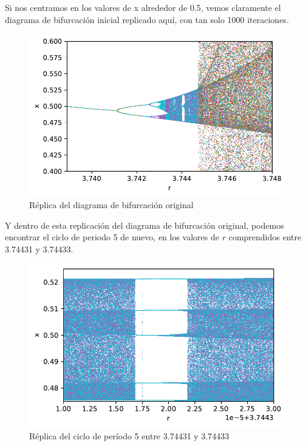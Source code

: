 \documentclass[
  10pt,
  a4paper,
  DIV=11,
  numbers=noendperiod,
  open=any]{scrreprt}
\numberwithin{equation}{chapter}
\numberwithin{equation}{section}
\renewcommand{\[}{\begin{equation}}
\renewcommand{\]}{\end{equation}}
\begin{document}
Si nos centramos en los valores de x alrededor de 0.5, vemos claramente
el diagrama de bifurcación inicial replicado aquí, con tan solo 1000
iteraciones.

\begin{figure}[h]
  \centering
  \includegraphics[keepaspectratio]{01-logistica/Caos_files/figure-pdf/cell-7-output-1.pdf}
  \caption{Réplica del diagrama de bifurcación original}
\end{figure}


Y dentro de esta replicación del diagrama de bifurcación original,
podemos encontrar el ciclo de periodo 5 de nuevo, en los valores de
\(r\) comprendidos entre 3.74431 y 3.74433.

\begin{figure}[h]
  \centering
  \includegraphics[keepaspectratio]{01-logistica/Caos_files/figure-pdf/cell-8-output-1.pdf}
  \caption{Réplica del ciclo de período 5 entre 3.74431 y 3.74433}
\end{figure}
\end{document}
